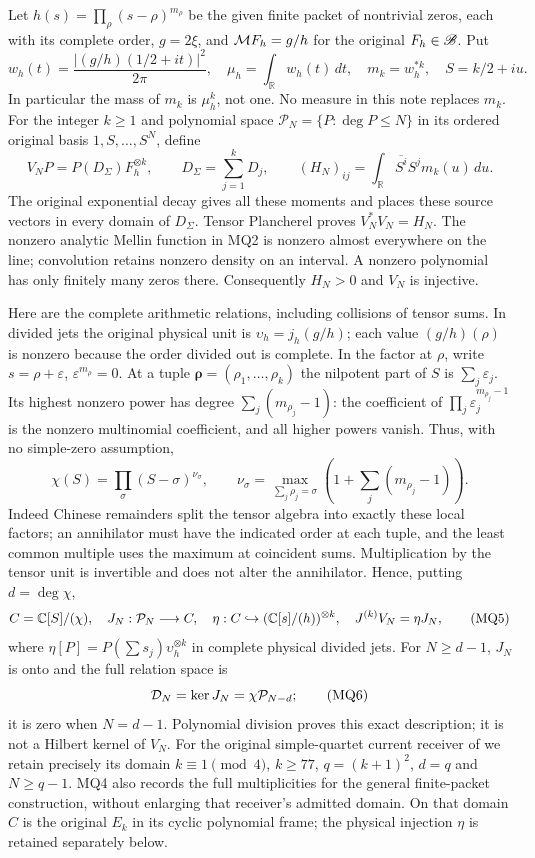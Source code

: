 Let $h(s)=\prod_\rho(s-\rho)^{m_\rho}$ be the given finite packet
of nontrivial zeros, each with its complete order, $g=2\xi$, and
$\mathcal M F_h=g/h$ for the original $F_h\in\mathscr B$. Put
\[
 w_h(t)=\frac{|(g/h)(1/2+it)|^2}{2\pi},\quad
 \mu_h=\int_{\mathbb R}w_h(t)\,dt,\quad
 m_k=w_h^{*k},\quad S=k/2+iu.                              \tag{MQ2}
\]
In particular the mass of $m_k$ is $\mu_h^k$, not one. No measure
in this note replaces $m_k$. For the integer $k\ge1$ and polynomial
space $\mathcal P_N=\{P:\deg P\le N\}$ in its ordered original
basis $1,S,\ldots,S^N$, define
\[
 V_NP=P(D_\Sigma)F_h^{\otimes k},\qquad
 D_\Sigma=\sum_{j=1}^kD_j,\qquad
 (H_N)_{ij}=\int_{\mathbb R}\overline{S^i}S^j m_k(u)\,du.
                                                               \tag{MQ3}
\]
The original exponential decay gives all these moments and places
these source vectors in every domain of $D_\Sigma$. Tensor
Plancherel proves $V_N^*V_N=H_N$. The nonzero analytic Mellin
function in MQ2 is nonzero almost everywhere on the line;
convolution retains nonzero density on an interval. A nonzero
polynomial has only finitely many zeros there. Consequently
$H_N>0$ and $V_N$ is injective.

Here are the complete arithmetic relations, including collisions of
tensor sums. In divided jets the original physical unit is
$\upsilon_h=j_h(g/h)$; each value $(g/h)(\rho)$ is nonzero because
the order divided out is complete. In the factor at $\rho$, write
$s=\rho+\varepsilon$, $\varepsilon^{m_\rho}=0$. At a tuple
$\boldsymbol\rho=(\rho_1,\ldots,\rho_k)$ the nilpotent part of
$S$ is $\sum_j\varepsilon_j$. Its highest nonzero power has degree
$\sum_j(m_{\rho_j}-1)$: the coefficient of
$\prod_j\varepsilon_j^{m_{\rho_j}-1}$ is the nonzero multinomial
coefficient, and all higher powers vanish. Thus, with no simple-zero
assumption,
\[
 \chi(S)=\prod_\sigma(S-\sigma)^{\nu_\sigma},\qquad
 \nu_\sigma=\max_{\sum_j\rho_j=\sigma}
       \left(1+\sum_j(m_{\rho_j}-1)\right).                    \tag{MQ4}
\]
Indeed Chinese remainders split the tensor algebra into exactly
these local factors; an annihilator must have the indicated order
at each tuple, and the least common multiple uses the maximum at
coincident sums. Multiplication by the tensor unit is invertible and
does not alter the annihilator. Hence, putting $d=\deg\chi$,
\[
 C=\mathbb C[S]/(\chi),\quad J_N:\mathcal P_N\longrightarrow C,
 \quad \eta:C\hookrightarrow(\mathbb C[s]/(h))^{\otimes k},\quad
 J^{(k)}V_N=\eta J_N,                                       \tag{MQ5}
\]
where $\eta[P]=P(\sum s_j)\upsilon_h^{\otimes k}$ in complete
physical divided jets. For $N\ge d-1$, $J_N$ is onto and the full
relation space is
\[
 \mathcal D_N=\ker J_N=\chi\mathcal P_{N-d};                         \tag{MQ6}
\]
it is zero when $N=d-1$. Polynomial division proves this exact
description; it is not a Hilbert kernel of $V_N$.
For the original simple-quartet current receiver of \cite{swmix:PD} we
retain precisely its domain $k\equiv1\pmod4$, $k\ge77$,
$q=(k+1)^2$, $d=q$ and $N\ge q-1$. MQ4 also records the full
multiplicities for the general finite-packet construction, without
enlarging that receiver's admitted domain.
On that domain $C$ is the original $E_k$ in its cyclic polynomial
frame; the physical injection $\eta$ is retained separately below.

